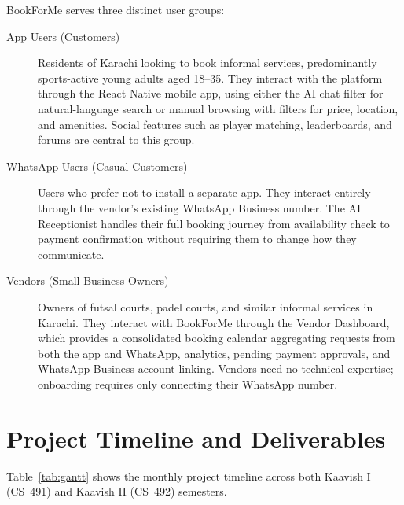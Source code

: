 BookForMe serves three distinct user groups:

\begin{description}
  \item[App Users (Customers)] Residents of Karachi looking to book informal
        services, predominantly sports-active young adults aged 18--35. They
        interact with the platform through the React Native mobile app, using
        either the AI chat filter for natural-language search or manual browsing
        with filters for price, location, and amenities. Social features such as
        player matching, leaderboards, and forums are central to this group.

  \item[WhatsApp Users (Casual Customers)] Users who prefer not to install a
        separate app. They interact entirely through the vendor's existing
        WhatsApp Business number. The AI Receptionist handles their full booking
        journey from availability check to payment confirmation without requiring
        them to change how they communicate.

  \item[Vendors (Small Business Owners)] Owners of futsal courts, padel courts,
        and similar informal services in Karachi. They
        interact with BookForMe through the Vendor Dashboard, which provides a
        consolidated booking calendar aggregating requests from both the app and
        WhatsApp, analytics, pending payment approvals, and WhatsApp Business
        account linking. Vendors need no technical expertise; onboarding requires
        only connecting their WhatsApp number.
\end{description}

\clearpage
\section{Project Timeline and Deliverables}
\label{sec:intro-gantt}

Table~\ref{tab:gantt} shows the monthly project timeline across both Kaavish I
(CS~491) and Kaavish II (CS~492) semesters.

